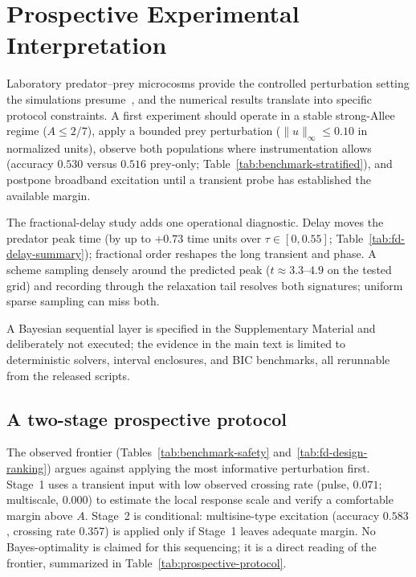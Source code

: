 \section{Prospective Experimental Interpretation}
\label{sec:prospect}

Laboratory predator--prey microcosms provide the controlled perturbation setting the simulations presume~\cite{E10,E11,E12}, and the numerical results translate into specific protocol constraints. A first experiment should operate in a stable strong-Allee regime ($A\le2/7$), apply a bounded prey perturbation ($\|u\|_\infty\le0.10$ in normalized units), observe both populations where instrumentation allows (accuracy $0.530$ versus $0.516$ prey-only; Table~\ref{tab:benchmark-stratified}), and postpone broadband excitation until a transient probe has established the available margin.

The fractional-delay study adds one operational diagnostic. Delay moves the predator peak time (by up to $+0.73$ time units over $\tau\in[0,0.55]$; Table~\ref{tab:fd-delay-summary}); fractional order reshapes the long transient and phase. A scheme sampling densely around the predicted peak ($t\approx3.3$--$4.9$ on the tested grid) and recording through the relaxation tail resolves both signatures; uniform sparse sampling can miss both.

A Bayesian sequential layer is specified in the Supplementary Material and deliberately not executed; the evidence in the main text is limited to deterministic solvers, interval enclosures, and BIC benchmarks, all rerunnable from the released scripts.

\subsection*{A two-stage prospective protocol}
The observed frontier (Tables~\ref{tab:benchmark-safety} and~\ref{tab:fd-design-ranking}) argues against applying the most informative perturbation first. Stage~1 uses a transient input with low observed crossing rate (pulse, $0.071$; multiscale, $0.000$) to estimate the local response scale and verify a comfortable margin above $A$. Stage~2 is conditional: multisine-type excitation (accuracy $0.583$, crossing rate $0.357$) is applied only if Stage~1 leaves adequate margin. No Bayes-optimality is claimed for this sequencing; it is a direct reading of the frontier, summarized in Table~\ref{tab:prospective-protocol}.

